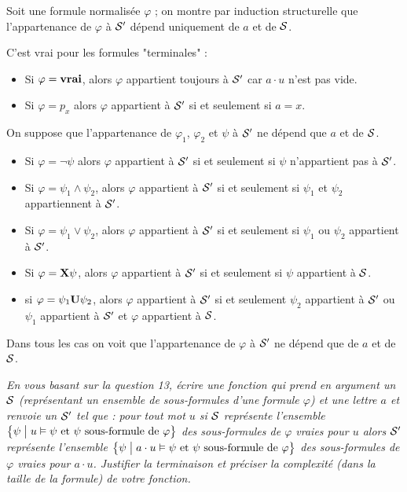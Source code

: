 \begin{Answer}
Soit  une formule normalisée $\varphi$ ; on montre par induction structurelle que l'appartenance de $\varphi$ à $\cal S'$ dépend uniquement de $a$ et de $\cal S$.

C'est vrai pour les formules "terminales" :

\begin{itemize}[itemindent=*, leftmargin=0pt]
  \item Si $\varphi={\bf vrai}$, alors $\varphi$ appartient toujours à $\cal S'$ car $a\cdot u$ n'est pas vide.
  \item Si $\varphi=p_x$ alors $\varphi$ appartient à $\cal S'$ si et seulement si $a = x$.
\end{itemize}

On suppose que l'appartenance de $\varphi_1$, $\varphi_2$ et $\psi$ à ${\cal S}'$ ne dépend que $a$ et de ${\cal S}$.

\begin{itemize}[itemindent=*, leftmargin=0pt]
  \item Si $\varphi=\neg\psi$ alors $\varphi$ appartient à $\cal S'$ si et seulement si $\psi$ n'appartient pas à $\cal S'$.
  \item Si $\varphi=\psi_1\wedge\psi_2$, alors $\varphi$ appartient à $\cal S'$ si et seulement si $\psi_1$ et $\psi_2$ appartiennent à $\cal S'$.
  \item Si $\varphi=\psi_1\vee\psi_2$, alors $\varphi$ appartient à $\cal S'$ si et seulement si $\psi_1$ ou $\psi_2$ appartient à $\cal S'$.
  \item Si $\varphi={\bf X}\psi$, alors $\varphi$ appartient à $\cal S'$ si et seulement si $\psi$ appartient à $\cal S$.
  \item si $\varphi=\psi_1{\bf U}\psi_2$, alors $\varphi$ appartient à $\cal S'$ si et seulement $\psi_2$ appartient à $\cal S'$ ou $\psi_1$ appartient à $\cal S'$ et $\varphi$ appartient à $\cal S$.
\end{itemize}

Dans tous les cas on voit que l'appartenance de $\varphi$ à ${\cal S}'$ ne dépend que de $a$ et de $\cal S$.
\end{Answer}
\begin{Exercise}\it
En vous basant sur la question 13, écrire une fonction  qui prend en argument un  $\cal S$ (représentant un ensemble de sous-formules d'une formule $\varphi$) et une lettre $a$ et renvoie un  $\cal S'$ tel que : pour tout mot $u$ si $\cal S$ représente l'ensemble $\bigl\{\psi\bigm|u\vDash \psi\text{ et }\psi \text{ sous-formule de $\varphi$}\bigr\}$ des sous-formules de $\varphi$ vraies pour $u$ alors $\cal S'$ représente l'ensemble $\bigl\{\psi\bigm|a\cdot u\vDash \psi\text{ et }\psi \text{ sous-formule de $\varphi$}\bigr\}$ des sous-formules de $\varphi$ vraies pour $a\cdot u$.
Justifier la terminaison et préciser la complexité (dans la taille de la formule) de votre fonction.
\end{Exercise}
